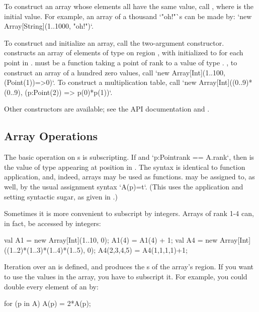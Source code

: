 To construct an array whose elements all have the same value, call
, where  is the initial value. 
For example, an array of a thousand \xcd`"oh!"`s can be made by:
\xcd`new Array[String](1..1000, "oh!")`.

To construct and initialize an array, call the two-argument constructor. 
 constructs an array of elements of type  on
region , with  initialized to  for each point
 in .   must be a function taking a point of rank
 to a value of type .  \Eg, to construct an array of a
hundred zero values, call
\xcd`new Array[Int](1..100, (Point(1))=>0)`. 
To construct a multiplication table, call
\xcd`new Array[Int]((0..9)*(0..9), (p:Point(2)) => p(0)*p(1))`.

Other constructors are available; see the API documentation and
. 

\subsection{Array Operations}

The basic operation on s is subscripting.  If  and 
\xcd`p:Point{rank == A.rank}`, then  is the value of type 
appearing at position  in .    The syntax is identical to
function application, and, indeed, arrays may be used as functions.
 may be assigned to, as well, by the usual assignment syntax
\xcd`A(p)=t`.
(This uses the application and setting syntactic sugar, as given in .)

Sometimes it is more convenient to subscript by integers.  Arrays of rank 1-4
can, in fact, be accessed by integers: 
\begin{xten}
val A1 = new Array[Int](1..10, 0);
A1(4) = A1(4) + 1;
val A4 = new Array[Int]((1..2)*(1..3)*(1..4)*(1..5), 0);
A4(2,3,4,5) = A4(1,1,1,1)+1;
\end{xten}



Iteration over an  is defined, and produces the s of the
array's region.  If you want to use the values in the array, you have to
subscript it.  For example, you could double every element of an
 by: 
\begin{xten}
for (p in A) A(p) = 2*A(p);
\end{xten}



